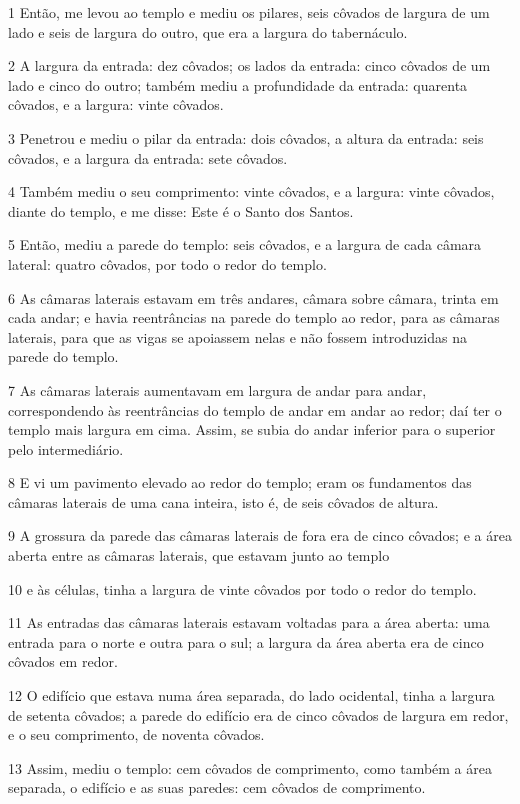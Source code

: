 \par 1 Então, me levou ao templo e mediu os pilares, seis côvados de largura de um lado e seis de largura do outro, que era a largura do tabernáculo.
\par 2 A largura da entrada: dez côvados; os lados da entrada: cinco côvados de um lado e cinco do outro; também mediu a profundidade da entrada: quarenta côvados, e a largura: vinte côvados.
\par 3 Penetrou e mediu o pilar da entrada: dois côvados, a altura da entrada: seis côvados, e a largura da entrada: sete côvados.
\par 4 Também mediu o seu comprimento: vinte côvados, e a largura: vinte côvados, diante do templo, e me disse: Este é o Santo dos Santos.
\par 5 Então, mediu a parede do templo: seis côvados, e a largura de cada câmara lateral: quatro côvados, por todo o redor do templo.
\par 6 As câmaras laterais estavam em três andares, câmara sobre câmara, trinta em cada andar; e havia reentrâncias na parede do templo ao redor, para as câmaras laterais, para que as vigas se apoiassem nelas e não fossem introduzidas na parede do templo.
\par 7 As câmaras laterais aumentavam em largura de andar para andar, correspondendo às reentrâncias do templo de andar em andar ao redor; daí ter o templo mais largura em cima. Assim, se subia do andar inferior para o superior pelo intermediário.
\par 8 E vi um pavimento elevado ao redor do templo; eram os fundamentos das câmaras laterais de uma cana inteira, isto é, de seis côvados de altura.
\par 9 A grossura da parede das câmaras laterais de fora era de cinco côvados; e a área aberta entre as câmaras laterais, que estavam junto ao templo
\par 10 e às células, tinha a largura de vinte côvados por todo o redor do templo.
\par 11 As entradas das câmaras laterais estavam voltadas para a área aberta: uma entrada para o norte e outra para o sul; a largura da área aberta era de cinco côvados em redor.
\par 12 O edifício que estava numa área separada, do lado ocidental, tinha a largura de setenta côvados; a parede do edifício era de cinco côvados de largura em redor, e o seu comprimento, de noventa côvados.
\par 13 Assim, mediu o templo: cem côvados de comprimento, como também a área separada, o edifício e as suas paredes: cem côvados de comprimento.
